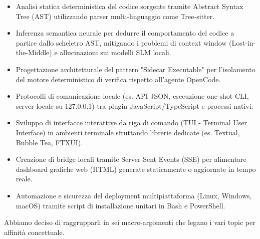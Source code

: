 \documentclass[a4paper, 11pt]{article}
\begin{document}
\begin{itemize}
    \item Analisi statica deterministica del codice sorgente tramite Abstract Syntax Tree (AST) utilizzando parser multi-linguaggio come Tree-sitter.\vspace{-0.2cm}
    \item Inferenza semantica neurale per dedurre il comportamento del codice a partire dallo scheletro AST, mitigando i problemi di context window (Lost-in-the-Middle) e allucinazioni sui modelli SLM locali.\vspace{-0.2cm}
    \item Progettazione architetturale del pattern "Sidecar Executable" per l'isolamento del motore deterministico di verifica rispetto all'agente OpenCode.\vspace{-0.2cm}
    \item Protocolli di comunicazione locale (es. API JSON, esecuzione one-shot CLI, server locale su 127.0.0.1) tra plugin JavaScript/TypeScript e processi nativi.\vspace{-0.2cm}
    \item Sviluppo di interfacce interattive da riga di comando (TUI - Terminal User Interface) in ambienti terminale sfruttando librerie dedicate (es. Textual, Bubble Tea, FTXUI).\vspace{-0.2cm}
    \item Creazione di bridge locali tramite Server-Sent Events (SSE) per alimentare dashboard grafiche web (HTML) generate staticamente o aggiornate in tempo reale.\vspace{-0.2cm}
    \item Automazione e sicurezza del deployment multipiattaforma (Linux, Windows, macOS) tramite script di installazione unitari in Bash e PowerShell.
\end{itemize}
Abbiamo deciso di raggrupparli in sei macro-argomenti che legano i vari topic per affinità concettuale.
\end{document}

